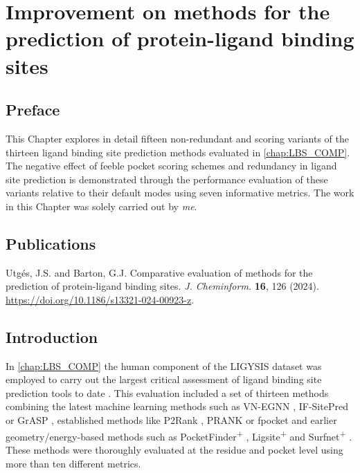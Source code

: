 \chapter{Improvement on methods for the prediction of protein-ligand binding sites}
\label{chap:LBS_IMPROV}

\section*{Preface}

This Chapter explores in detail fifteen non-redundant and scoring variants of the thirteen ligand binding site prediction methods evaluated in \autoref{chap:LBS_COMP}. The negative effect of feeble pocket scoring schemes and redundancy in ligand site prediction is demonstrated through the performance evaluation of these variants relative to their default modes using seven informative metrics. The work in this Chapter was solely carried out by \textit{me}.

\section*{Publications}

Utgés, J.S. and Barton, G.J. Comparative evaluation of methods for the prediction of protein-ligand binding sites. \textit{J. Cheminform.} \textbf{16}, 126 (2024). \url{https://doi.org/10.1186/s13321-024-00923-z}.



\section{Introduction}

In \autoref{chap:LBS_COMP} the human component of the LIGYSIS dataset was employed to carry out the largest critical assessment of ligand binding site prediction tools to date \cite{UTGES_2024_LBSCOMP}. This evaluation included a set of thirteen methods combining the latest machine learning methods such as VN-EGNN \cite{SESTAK_2024_VNEGNN}, IF-SitePred \cite{CARBERY_2024_IFSP} or GrASP \cite{SMITH_2024_GrASP}, established methods like P2Rank \cite{KRIVAK_2015_P2RANK, KRIVAK_2018_P2RANK}, PRANK \cite{KRIVAK_2015_PRANK} or fpocket \cite{GUILLOUX_2009_FPOCKET, SCHMIDTKE_2010_FPOCKET2} and earlier geometry/energy-based methods such as PocketFinder\textsuperscript{+} \cite{AN_2005_POCKETFINDER}, Ligsite\textsuperscript{+} \cite{HENDLICH_1997_LIGSITE} and Surfnet\textsuperscript{+} \cite{LASKOWSKI_1995_SURFNET}. These methods were thoroughly evaluated at the residue and pocket level using more than ten different metrics.

